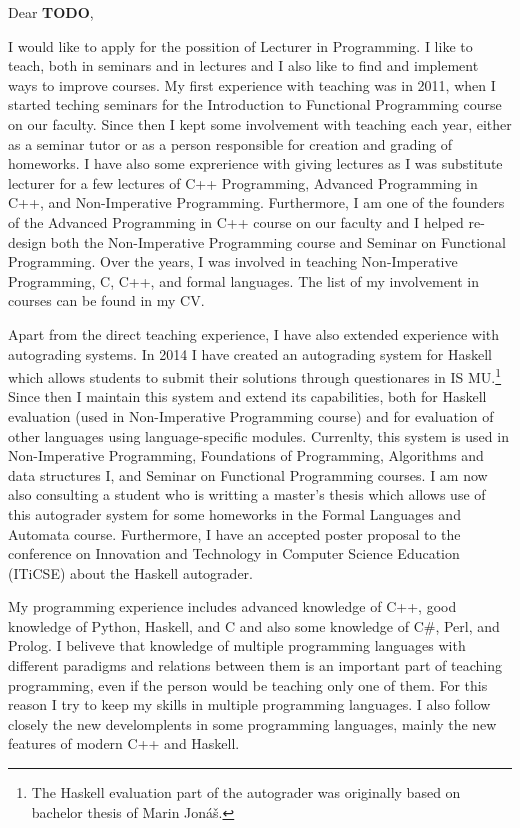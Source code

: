 \documentclass[11pt,a4paper]{article}
\newcommand{\TODO}[1]{{\bf\color{red}#1}}
\begin{document}
Dear \TODO{TODO},

\smallskip
I would like to apply for the possition of Lecturer in Programming.
I like to teach, both in seminars and in lectures and I also like to find and implement ways to improve courses.
My first experience with teaching was in 2011, when I started teching seminars for the Introduction to Functional Programming course on our faculty.
Since then I kept some involvement with teaching each year, either as a seminar tutor or as a person responsible for creation and grading of homeworks.
I have also some exprerience with giving lectures as I was substitute lecturer for a few lectures of C++ Programming, Advanced Programming in C++, and Non-Imperative Programming.
Furthermore, I am one of the founders of the Advanced Programming in C++ course on our faculty and I helped re-design both the Non-Imperative Programming course and Seminar on Functional Programming.
Over the years, I was involved in teaching Non-Imperative Programming, C, C++, and formal languages.
The list of my involvement in courses can be found in my CV.

Apart from the direct teaching experience, I have also extended experience with autograding systems.
In 2014 I have created an autograding system for Haskell which allows students to submit their solutions through questionares in IS MU.\footnote{The Haskell evaluation part of the autograder was originally based on bachelor thesis of Marin Jonáš.}
Since then I maintain this system and extend its capabilities, both for Haskell evaluation (used in Non-Imperative Programming course) and for evaluation of other languages using language-specific modules.
Currenlty, this system is used in Non-Imperative Programming, Foundations of Programming, Algorithms and data structures I, and Seminar on Functional Programming courses.
I am now also consulting a student who is writting a master's thesis which allows use of this autograder system for some homeworks in the Formal Languages and Automata course.
Furthermore, I have an accepted poster proposal to the conference on Innovation and Technology in Computer Science Education (ITiCSE) about the Haskell autograder.

My programming experience includes advanced knowledge of C++, good knowledge of Python, Haskell, and C and also some knowledge of C\#, Perl, and Prolog.
I beliveve that knowledge of multiple programming languages with different paradigms and relations between them is an important part of teaching programming, even if the person would be teaching only one of them.
For this reason I try to keep my skills in multiple programming languages.
I also follow closely the new develomplents in some programming languages, mainly the new features of modern C++ and Haskell.
\end{document}
